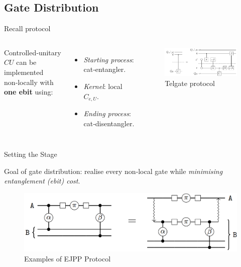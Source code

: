 \documentclass{beamer}
\begin{document}
	\subsection{Gate Distribution}
	\begin{frame}{Recall protocol}
		\begin{columns}[T]
			Controlled‑unitary \(CU\) can be implemented non‑locally with \textbf{one ebit} using:
			\begin{itemize}
				\item \emph{Starting process}: cat‑entangler.
				\item \emph{Kernel}: local $C_{e,U}$.
				\item \emph{Ending process}: cat‑disentangler.
			\end{itemize}
			\centering
			\begin{figure}
				\includegraphics[width=\linewidth]{figures/EJPP_protocol.pdf}
				\caption{Telgate protocol}
			\end{figure}
		\end{columns}
	\end{frame}
	\begin{frame}{Setting the Stage}
		
		Goal of gate distribution: realise every non‑local gate while \emph{minimising entanglement (ebit) cost}.  
		\begin{figure}
			\includegraphics[width=.8\textwidth]{figures/emb.png}
			\caption[]{Examples of EJPP Protocol}
		\end{figure}
	\end{frame}
	
\end{document}
